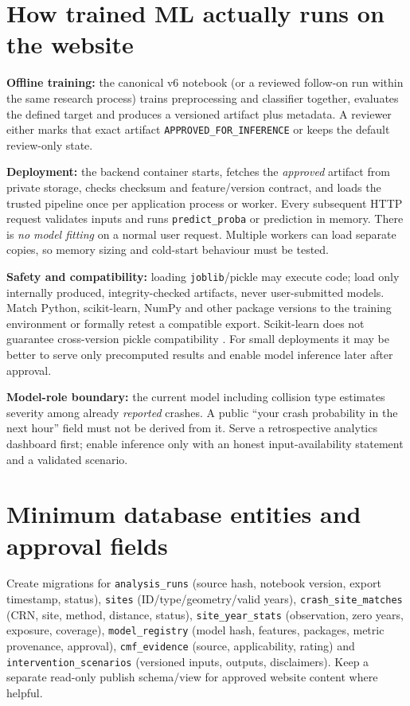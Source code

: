 \documentclass[11pt,a4paper,openany]{report}
\newcommand{\pathcode}[1]{\nolinkurl{#1}}
\begin{document}
\section{How trained ML actually runs on the website}
\textbf{Offline training:} the canonical v6 notebook (or a reviewed follow-on run within the same research process) trains preprocessing and classifier together, evaluates the defined target and produces a versioned artifact plus metadata. A reviewer either marks that exact artifact \pathcode{APPROVED_FOR_INFERENCE} or keeps the default review-only state.

\textbf{Deployment:} the backend container starts, fetches the \emph{approved} artifact from private storage, checks checksum and feature/version contract, and loads the trusted pipeline once per application process or worker. Every subsequent HTTP request validates inputs and runs \pathcode{predict_proba} or prediction in memory. There is \emph{no model fitting} on a normal user request. Multiple workers can load separate copies, so memory sizing and cold-start behaviour must be tested.

\textbf{Safety and compatibility:} loading \pathcode{joblib}/pickle may execute code; load only internally produced, integrity-checked artifacts, never user-submitted models. Match Python, scikit-learn, NumPy and other package versions to the training environment or formally retest a compatible export. Scikit-learn does not guarantee cross-version pickle compatibility \cite{Sklearn}. For small deployments it may be better to serve only precomputed results and enable model inference later after approval.

\textbf{Model-role boundary:} the current model including collision type estimates severity among already \emph{reported} crashes. A public ``your crash probability in the next hour'' field must not be derived from it. Serve a retrospective analytics dashboard first; enable inference only with an honest input-availability statement and a validated scenario.

\section{Minimum database entities and approval fields}
Create migrations for \texttt{analysis\_runs} (source hash, notebook version, export timestamp, status), \texttt{sites} (ID/type/geometry/valid years), \texttt{crash\_site\_matches} (CRN, site, method, distance, status), \texttt{site\_year\_stats} (observation, zero years, exposure, coverage), \texttt{model\_registry} (model hash, features, packages, metric provenance, approval), \texttt{cmf\_evidence} (source, applicability, rating) and \texttt{intervention\_scenarios} (versioned inputs, outputs, disclaimers). Keep a separate read-only publish schema/view for approved website content where helpful.
\end{document}
